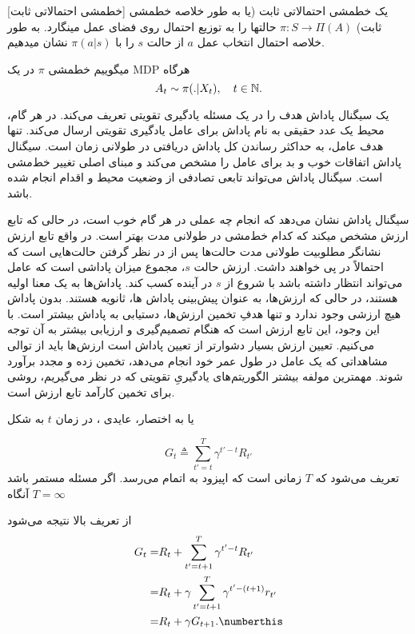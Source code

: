[خط\nf مشی احتمالاتی ثابت]
یک خط\nf مشی احتمالاتی ثابت (یا به طور خلاصه خط\nf مشی ثابت) 
$\pi: S \to \Pi(A)$
حالت\nf ها را به توزیع احتمال روی فضای عمل می\nf نگارد.
به طور خلاصه احتمال انتخاب عمل $a$ از حالت $s$ را با
$\pi(a|s)$
نشان می\nf دهیم.

 می\nf گوییم خط\nf مشی $\pi$ در یک MDP  هرگاه
$$A_t \sim \pi(. |X_t),	 \quad t \in \mathbb{N}.$$


یک سیگنال پاداش هدف را در یک مسئله یادگیری تقویتی تعریف می‌کند. در هر گام، محیط یک عدد حقیقی به نام پاداش برای عامل یادگیری تقویتی ارسال می‌کند. تنها هدف عامل، به حداکثر رساندن کل پاداش دریافتی در طولانی زمان است. سیگنال پاداش اتفاقات خوب و بد برای عامل را مشخص می‌کند و مبنای اصلی تغییر خط‌مشی است.
سیگنال پاداش می‌تواند تابعی تصادفی از وضعیت محیط و اقدام انجام شده باشد.


 سیگنال پاداش نشان می‌دهد که انجام چه عملی در هر گام خوب است، در حالی که تابع ارزش مشخص می\nf کند که کدام خط‌مشی در طولانی مدت بهتر است. در واقع تابع ارزش نشانگر مطلوبیت طولانی مدت حالت‌ها پس از در نظر گرفتن حالت‌هایی است که احتمالاً در پی خواهند داشت.
ارزش حالت $s$، مجموع میزان پاداشی است که عامل می‌تواند انتظار داشته باشد با شروع از $s$ در آینده کسب کند.
پاداش‌ها به یک معنا اولیه هستند، در حالی که ارزش‌ها، به عنوان پیش‌بینی پاداش ها، ثانویه هستند. بدون پاداش هیچ ارزشی وجود ندارد و تنها هدفِ تخمین ارزش‌ها، دستیابی به پاداش بیشتر است. با این وجود، این تابع ارزش است که هنگام تصمیم‌گیری و ارزیابی بیشتر به آن توجه می‌کنیم.
تعیین ارزش‌ بسیار دشوارتر از تعیین پاداش است
ارزش‌ها باید از توالی مشاهداتی که یک عامل در طول عمر خود انجام می‌دهد، تخمین زده و مجدد برآورد شوند.
مهمترین مولفه بیشتر الگوریتم‌های یادگیریِ تقویتی که در نظر می‌گیریم، روشی برای تخمین کارآمد تابع ارزش است.

 یا به اختصار، عایدی ، در زمان $t$ به شکل

$$G_t \triangleq \sum_{t'=t}^{T} \gamma^{t'-t} R_{t'}$$
تعریف می‌شود که $T$ زمانی است که اپیزود به اتمام می‌رسد. اگر مسئله مستمر باشد آنگاه 
$T=\infty$

از تعریف بالا نتیجه می‌شود 
\begin{align}
G_t =& R_t + \sum_{t'=t+1}^{T} \gamma^{t'-t} R_{t'} \nonumber \\
=& R_t + \gamma \sum_{t'=t+1}^{T} \gamma^{t' - (t+1)} r_{t'} \nonumber \\
=& R_t + \gamma G_{t+1}. \numberthis
\end{align}


